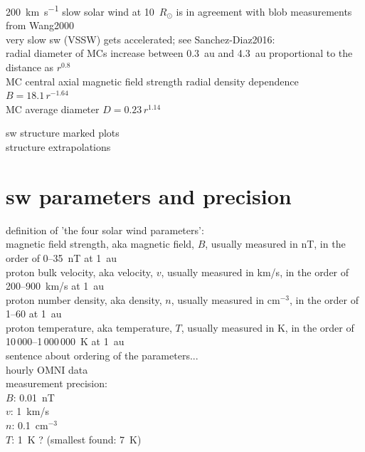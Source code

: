 \SI{200}{\km\per\s} slow solar wind at 10~$R_\odot$ is in agreement with blob measurements from Wang2000\\

very slow sw (VSSW) gets accelerated; see Sanchez-Diaz2016:\\


radial diameter of MCs increase between 0.3~au and 4.3~au proportional to the distance as $r^{0.8}$ \citep{Bothmer1998}\\
MC central axial magnetic field strength radial density dependence $B = 18.1\,r^{-1.64}$ \citet{Leitner2007}\\
MC average diameter $D = 0.23\,r^{1.14}$ \citet{Leitner2007}

sw structure marked plots\\

structure extrapolations\\


\section{sw parameters and precision}
definition of 'the four solar wind parameters':\\	%
	magnetic field strength, aka magnetic field, $B$, usually measured in nT, in the order of 0--35~nT at 1~au\\
	proton bulk velocity, aka velocity, $v$, usually measured in km/s, in the order of 200--900~km/s at 1~au\\
	proton number density, aka density, $n$, usually measured in cm$^{-3}$, in the order of 1--60 at 1~au\\
	proton temperature, aka temperature, $T$, usually measured in K, in the order of 10\,000--1\,000\,000~K at 1~au\\
sentence about ordering of the parameters...\\

hourly OMNI data\\
measurement precision:\\
$B$: 0.01~nT\\
$v$: 1~km/s\\
$n$: 0.1~cm$^{-3}$\\
$T$: 1~K ? (smallest found: 7~K)\\

